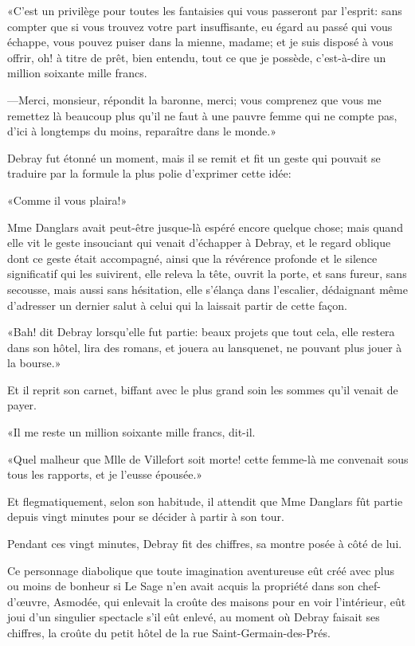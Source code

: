 «C'est un privilège pour toutes les fantaisies qui vous passeront par l'esprit: sans compter que si vous trouvez votre part insuffisante, eu égard au passé qui vous échappe, vous pouvez puiser dans la mienne, madame; et je suis disposé à vous offrir, oh! à titre de prêt, bien entendu, tout ce que je possède, c'est-à-dire un million soixante mille francs. 

—Merci, monsieur, répondit la baronne, merci; vous comprenez que vous me remettez là beaucoup plus qu'il ne faut à une pauvre femme qui ne compte pas, d'ici à longtemps du moins, reparaître dans le monde.» 

Debray fut étonné un moment, mais il se remit et fit un geste qui pouvait se traduire par la formule la plus polie d'exprimer cette idée: 

«Comme il vous plaira!» 

Mme Danglars avait peut-être jusque-là espéré encore quelque chose; mais quand elle vit le geste insouciant qui venait d'échapper à Debray, et le regard oblique dont ce geste était accompagné, ainsi que la révérence profonde et le silence significatif qui les suivirent, elle releva la tête, ouvrit la porte, et sans fureur, sans secousse, mais aussi sans hésitation, elle s'élança dans l'escalier, dédaignant même d'adresser un dernier salut à celui qui la laissait partir de cette façon. 

«Bah! dit Debray lorsqu'elle fut partie: beaux projets que tout cela, elle restera dans son hôtel, lira des romans, et jouera au lansquenet, ne pouvant plus jouer à la bourse.» 

Et il reprit son carnet, biffant avec le plus grand soin les sommes qu'il venait de payer. 

«Il me reste un million soixante mille francs, dit-il. 

«Quel malheur que Mlle de Villefort soit morte! cette femme-là me convenait sous tous les rapports, et je l'eusse épousée.» 

Et flegmatiquement, selon son habitude, il attendit que Mme Danglars fût partie depuis vingt minutes pour se décider à partir à son tour. 

Pendant ces vingt minutes, Debray fit des chiffres, sa montre posée à côté de lui. 

Ce personnage diabolique que toute imagination aventureuse eût créé avec plus ou moins de bonheur si Le Sage n'en avait acquis la propriété dans son chef-d'œuvre, Asmodée, qui enlevait la croûte des maisons pour en voir l'intérieur, eût joui d'un singulier spectacle s'il eût enlevé, au moment où Debray faisait ses chiffres, la croûte du petit hôtel de la rue Saint-Germain-des-Prés. 

